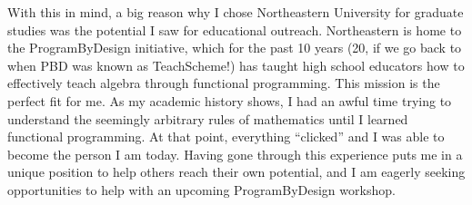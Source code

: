 \documentclass[12pt]{article}
\begin{document}
With this in mind, a big reason why I chose Northeastern University for graduate studies was the potential I saw for educational outreach.
Northeastern is home to the ProgramByDesign initiative, which for the past 10 years (20, if we go back to when PBD was known as TeachScheme!) has taught high school educators how to effectively teach algebra through functional programming.
This mission is the perfect fit for me.
As my academic history shows, I had an awful time trying to understand the seemingly arbitrary rules of mathematics until I learned functional programming.
At that point, everything ``clicked'' and I was able to become the person I am today.
Having gone through this experience puts me in a unique position to help others reach their own potential, and I am eagerly seeking opportunities to help with an upcoming ProgramByDesign workshop.

\vfill
\renewcommand{\section}[2]{}
\begin{multicols}{2}
\footnotesize


\end{multicols}
\end{document}
